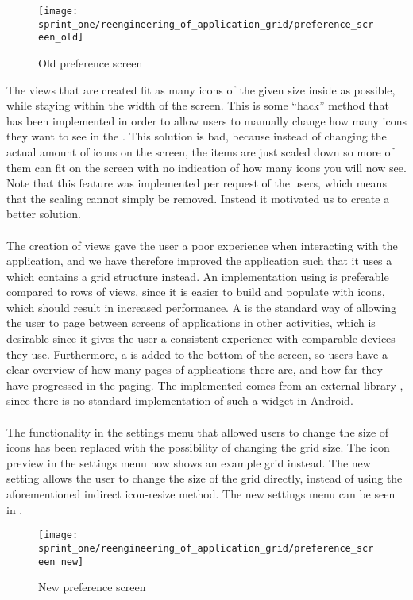 \begin{figure}[!htbp]
    \centering
    \texttt{[image: sprint\_one/reengineering\_of\_application\_grid/preference\_screen\_old]}
    \caption{Old preference screen}
    \label{fig:preference_screen_old}
\end{figure}

The  views that are created fit as many icons of the given size inside as possible, while staying within the width of the screen. This is some ``hack'' method that has been implemented in order to allow users to manually change how many icons they want to see in the \launcher. This solution is bad, because instead of changing the actual amount of icons on the screen, the items are just scaled down so more of them can fit on the screen with no indication of how many icons you will now see. Note that this feature was implemented per request of the users, which means that the scaling cannot simply be removed. Instead it motivated us to create a better solution.
\\\\
The creation of  views gave the user a poor experience when interacting with the application, and we have therefore improved the \launcher application such that it uses a  which contains a grid structure instead. An implementation using  is preferable compared to rows of  views, since it is easier to build and populate with icons, which should result in increased performance. A  is the standard way of allowing the user to page between screens of applications in other \launcher activities, which is desirable since it gives the user a consistent experience with comparable devices they use. Furthermore, a  is added to the bottom of the screen, so users have a clear overview of how many pages of applications there are, and how far they have progressed in the paging. The implemented  comes from an external library \parencite{view_pager_indicator_avianey}, since there is no standard implementation of such a widget in Android.
\\\\
The functionality in the settings menu that allowed users to change the size of icons has been replaced with the possibility of changing the \launcher grid size. The icon preview in the settings menu now shows an example grid instead. The new setting allows the user to change the size of the grid directly, instead of using the aforementioned indirect icon-resize method. The new settings menu can be seen in .


\begin{figure}[!htbp]
    \centering
    \texttt{[image: sprint\_one/reengineering\_of\_application\_grid/preference\_screen\_new]}
    \caption{New preference screen}
    \label{fig:preference_screen_new}
\end{figure}
